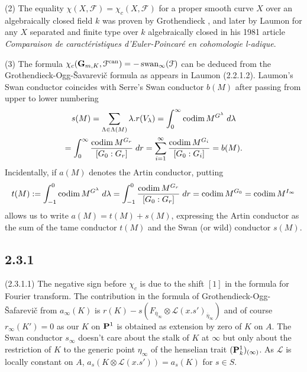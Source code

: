 \documentclass[deligne.tex]{subfiles}
\begin{document}
(2)
The equality $\chi(X,\mathcal F)=\chi_c(X,\mathcal F)$ for a proper smooth
curve $X$ over an algebraically closed field $k$ was proven by Grothendieck
\cite[Exp. X (7.12)]{SGA5}, and later by Laumon for any $X$ separated and
finite type over $k$ algebraically closed in his 1981 article
\emph{Comparaison de caractéristiques d'Euler-Poincaré en cohomologie l-adique}.

(3) The formula
$\chi_c(\mathbf{G}_{m,K},\mathcal F^{\mathrm{can}})=-\operatorname{swan}_\infty(\mathcal F)$
can be deduced from the Grothendieck-Ogg-\v Savarevi\v c formula as appears
in Laumon (2.2.1.2). Laumon's Swan conductor coincides with Serre's
Swan conductor $b(M)$ after passing from upper to lower numbering
\begin{multline*}
	s(M)=\sum_{\Lambda\in\Lambda(M)}\lambda.r(V_\lambda)
	=\int_0^\infty\operatorname{codim} M^{G^\lambda}\;d\lambda \\
	=\int_0^\infty\frac{\operatorname{codim} M^{G_r}}{[G_0:G_r]}\;dr
	=\sum_{i=1}^\infty\frac{\operatorname{codim} M^{G_i}}{[G_0:G_i]}=b(M).
\end{multline*}
Incidentally, if $a(M)$ denotes the Artin conductor, putting
\begin{equation*}
	t(M):=\int_{-1}^0\operatorname{codim} M^{G^\lambda}\;d\lambda=\int_{-1}^0\frac{\operatorname{codim} M^{G_r}}{[G_0:G_r]}\;dr=\operatorname{codim} M^{G_0}=\operatorname{codim} M^{I_\infty}
\end{equation*}
allows us to write $a(M)=t(M)+s(M)$, expressing the Artin conductor as the
sum of the tame conductor $t(M)$ and the Swan (or wild) conductor $s(M)$.


\subsection*{2.3.1}\label{laumon:2.3.1}
(2.3.1.1) The negative sign before $\chi_c$ is due to the shift $[1]$ in
the formula for Fourier transform. The contribution in the formula of
Grothendieck-Ogg-\v Safarevi\v c from $a_\infty(K)$ is
$r(K)-s(F_{\overline\eta_\infty}\otimes\mathscr L(x.s')_{\overline\eta_\infty})$
and of course $r_\infty(K')=0$ as our $K$ on $\mathbf{P}^1$ is obtained as 
extension by zero of $K$ on $A$. The Swan conductor $s_\infty$ doesn't 
care about the stalk of $K$ at $\infty$ but only about the 
restriction of $K$ to the generic point $\eta_{\infty}$ of the henselian
trait $(\mathbf{P}^1_k)_{(\infty)}$. As $\mathscr L$ is locally constant on $A$,
$a_s(K\otimes\mathscr L(x.s'))=a_s(K)$ for $s\in S$.
\end{document}
